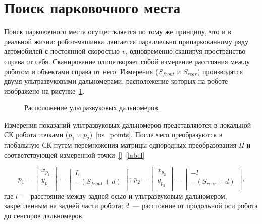 \newpage
\section{Поиск парковочного места}

Поиск парковочного места осуществляется по тому же принципу, что и в реальной жизни: робот-машинка двигается параллельно припаркованному ряду автомобилей с постоянной скоростью $v$, одновременно сканируя пространство справа от себя. Сканирование олицетворяет собой измерение расстояния между роботом и объектами справа от него.
Измерения ($S_{front}$ и $S_{rear}$) производятся двумя ультразвуковыми дальномерами, расположение которых на роботе изображено на рисунке~\ref{robot_and_us_sensors}.

\begin{figure}[h!]
	\begin{minipage}[h]{0.47\textwidth}
	\end{minipage}
	\hfill
	\begin{minipage}[h]{0.47\textwidth}
	\end{minipage}
	\caption{Расположение ультразвуковых дальномеров.}
	\label{robot_and_us_sensors}
\end{figure}

Измерения показаний ультразвуковых дальномеров представляются в локальной СК робота точками ($p_{1}$ и $p_{2}$)~\eqref{us_points}. После чего преобразуются в глобальную СК путем перемножения матрицы однородных преобразования $H$ и соответствующей измеренной точки~\eqref{}--\eqref{label}

\begin{equation}\label{us_points}
p_{1} = 
\begin{bmatrix}
x_{p_1} \\
y_{p_1} \\
\end{bmatrix}
=
\begin{bmatrix}
L \\
- (S_{front} + d) \\
\end{bmatrix}\!\!;~
p_{2} = 
\begin{bmatrix}
x_{p_2} \\
y_{p_2} \\
\end{bmatrix}
=
\begin{bmatrix}
-l \\
- (S_{rear} + d) \\
\end{bmatrix}\!\!.
\end{equation}
где $l$~--- расстояние между задней осью и ультразвуковым дальномером, закрепленным на задней части робота; $d$~--- расстояние от продольной оси робота до сенсоров дальномеров.

